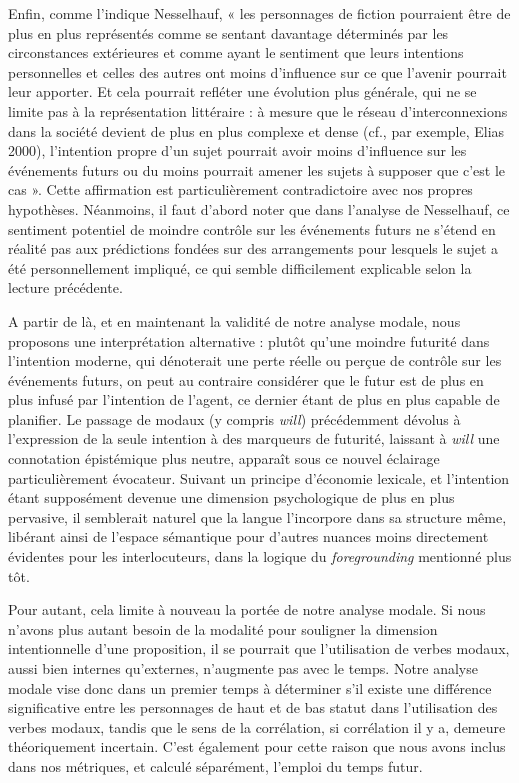 Enfin, comme l'indique Nesselhauf, « les personnages de fiction pourraient être de plus en plus représentés comme se sentant davantage déterminés par les circonstances extérieures et comme ayant le sentiment que leurs intentions personnelles et celles des autres ont moins d'influence sur ce que l'avenir pourrait leur apporter. Et cela pourrait refléter une évolution plus générale, qui ne se limite pas à la représentation littéraire : à mesure que le réseau d'interconnexions dans la société devient de plus en plus complexe et dense (cf., par exemple, Elias 2000), l'intention propre d'un sujet pourrait avoir moins d'influence sur les événements futurs ou du moins pourrait amener les sujets à supposer que c'est le cas ». Cette affirmation est particulièrement contradictoire avec nos propres hypothèses. Néanmoins, il faut d'abord noter que dans l'analyse de Nesselhauf, ce sentiment potentiel de moindre contrôle sur les événements futurs ne s'étend en réalité pas aux prédictions fondées sur des arrangements pour lesquels le sujet a été personnellement impliqué, ce qui semble difficilement explicable selon la lecture précédente.

A partir de là, et en maintenant la validité de notre analyse modale, nous proposons une interprétation alternative : plutôt qu’une moindre futurité dans l'intention moderne, qui dénoterait une perte réelle ou perçue de contrôle sur les événements futurs, on peut au contraire considérer que le futur est de plus en plus infusé par l'intention de l’agent, ce dernier étant de plus en plus capable de planifier. Le passage de modaux (y compris \textit{will}) précédemment dévolus à l'expression de la seule intention à des marqueurs de futurité, laissant à \textit{will} une connotation épistémique plus neutre, apparaît sous ce nouvel éclairage particulièrement évocateur. Suivant un principe d'économie lexicale, et l'intention étant supposément devenue une dimension psychologique de plus en plus pervasive, il semblerait naturel que la langue l'incorpore dans sa structure même, libérant ainsi de l'espace sémantique pour d'autres nuances moins directement évidentes pour les interlocuteurs, dans la logique du \textit{foregrounding} mentionné plus tôt.

Pour autant, cela limite à nouveau la portée de notre analyse modale. Si nous n'avons plus autant besoin de la modalité pour souligner la dimension intentionnelle d'une proposition, il se pourrait que l'utilisation de verbes modaux, aussi bien internes qu'externes, n'augmente pas avec le temps. Notre analyse modale vise donc dans un premier temps à déterminer s'il existe une différence significative entre les personnages de haut et de bas statut dans l'utilisation des verbes modaux, tandis que le sens de la corrélation, si corrélation il y a, demeure théoriquement incertain. C'est également pour cette raison que nous avons inclus dans nos métriques, et calculé séparément, l'emploi du temps futur.

